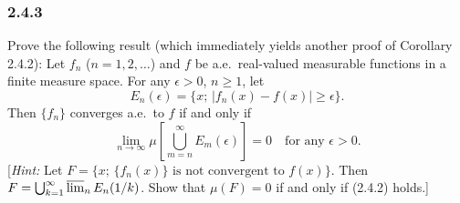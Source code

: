 \documentclass{report}
\theoremstyle{remark}
\begin{document}
\subsubsection*{2.4.3}
Prove the following result (which immediately yields another proof of Corollary 2.4.2): Let $f_n$ ($n = 1,2,\dots$) and $f$ be a.e.\ real-valued measurable functions in a finite measure space. For any $\epsilon > 0$, $n \ge 1$, let
\begin{equation*}
  E_n(\epsilon) = \{x; \, |f_n(x) - f(x)| \ge \epsilon\}.
\end{equation*}
Then $\{f_n\}$ converges a.e.\ to $f$ if and only if
\begin{equation*}
  \lim_{n \to \infty} \mu \left[ \bigcup_{m=n}^\infty E_m(\epsilon) \right] = 0 \quad \text{for any $\epsilon > 0$.} \tag{2.4.2}
\end{equation*}
[\emph{Hint:} Let $F = \{x; \, \text{$\{f_n(x)\}$ is not convergent to $f(x)$}\}$. Then \\ $F = \bigcup_{k=1}^\infty \varlimsup_n E_n(1/k)$. Show that $\mu(F) = 0$ if and only if (2.4.2) holds.]
\end{document}
